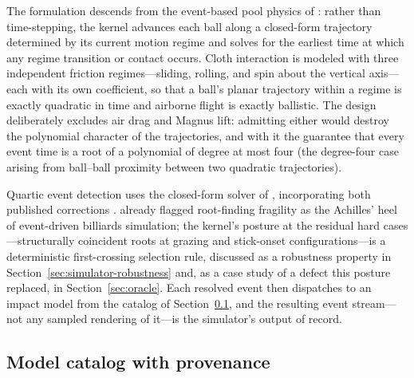 The formulation descends from the event-based pool physics of
\citet{leckie2006event}: rather than time-stepping, the kernel advances
each ball along a closed-form trajectory determined by its current motion
regime and solves for the earliest time at which any regime transition or
contact occurs. Cloth interaction is modeled with three independent
friction regimes---sliding, rolling, and spin about the vertical
axis---each with its own coefficient, so that a ball's planar trajectory
within a regime is exactly quadratic in time and airborne flight is exactly
ballistic. The design deliberately excludes air drag and Magnus lift:
admitting either would destroy the polynomial character of the
trajectories, and with it the guarantee that every event time is a root of
a polynomial of degree at most four (the degree-four case arising from
ball--ball proximity between two quadratic trajectories).

Quartic event detection uses the closed-form solver of
\citet{orellana2020algorithm1010}, incorporating both published corrections
\citep{demichele2022remark,demichele2024remark}. \citet{leckie2006event}
already flagged root-finding fragility as the Achilles' heel of
event-driven billiards simulation; the kernel's posture at the residual
hard cases---structurally coincident roots at grazing and stick-onset
configurations---is a deterministic first-crossing selection rule, discussed
as a robustness property in Section~\ref{sec:simulator-robustness} and, as
a case study of a defect this posture replaced, in
Section~\ref{sec:oracle}. Each resolved event then dispatches to an impact
model from the catalog of Section~\ref{sec:simulator-catalog}, and the
resulting event stream---not any sampled rendering of it---is the
simulator's output of record.

\subsection{Model catalog with provenance}
\label{sec:simulator-catalog}

